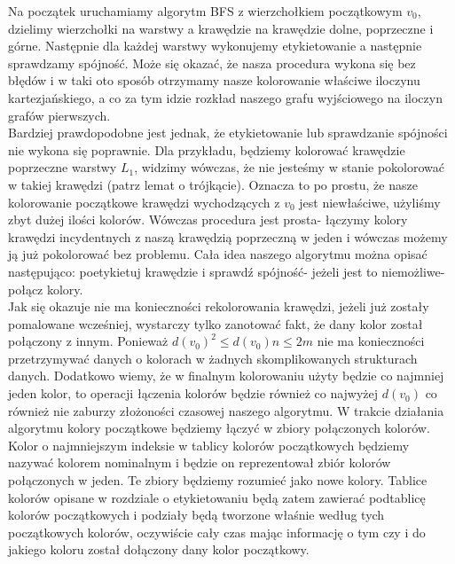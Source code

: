 \documentclass[12pt,a4paper,titlepage]{article}
\newcommand\tab[1][1cm]{\hspace*{#1}}
\begin{document}
\tab[0.6cm]Na początek uruchamiamy algorytm BFS z wierzchołkiem początkowym $v_0$, dzielimy wierzchołki na warstwy a krawędzie na krawędzie dolne, poprzeczne i górne. Następnie dla każdej warstwy wykonujemy etykietowanie a następnie sprawdzamy spójność. Może się okazać, że nasza procedura wykona się bez błędów i w taki oto sposób otrzymamy nasze kolorowanie właściwe iloczynu kartezjańskiego, a co za tym idzie rozkład naszego grafu wyjściowego na iloczyn grafów pierwszych.\\
\tab[0.6cm]Bardziej prawdopodobne jest jednak, że etykietowanie lub sprawdzanie spójności nie wykona się poprawnie. Dla przykładu, będziemy kolorować krawędzie poprzeczne warstwy $L_1$, widzimy wówczas, że nie jesteśmy w stanie pokolorować w takiej krawędzi (patrz lemat o trójkącie). Oznacza to po prostu, że nasze kolorowanie początkowe krawędzi wychodzących z $v_0$ jest niewłaściwe, użyliśmy zbyt dużej ilości kolorów. Wówczas procedura jest prosta- łączymy kolory krawędzi incydentnych z naszą krawędzią poprzeczną w jeden i wówczas możemy ją już pokolorować bez problemu. Cała idea naszego algorytmu można opisać następująco: poetykietuj krawędzie i sprawdź spójność- jeżeli jest to niemożliwe- połącz kolory. \\
\tab[0.6cm]Jak się okazuje nie ma konieczności rekolorowania krawędzi, jeżeli już zostały pomalowane wcześniej, wystarczy tylko zanotować fakt, że dany kolor został połączony z innym. Ponieważ $d(v_0)^2 \leqslant d(v_0)n \leqslant 2m $ nie ma konieczności przetrzymywać danych o kolorach w żadnych skomplikowanych strukturach danych. Dodatkowo wiemy, że w finalnym kolorowaniu użyty będzie co najmniej jeden kolor, to operacji łączenia kolorów będzie również co najwyżej $d(v_0)$ co również nie zaburzy złożoności czasowej naszego algorytmu. W trakcie działania algorytmu kolory początkowe będziemy łączyć w zbiory połączonych kolorów. Kolor o najmniejszym indeksie w tablicy kolorów początkowych będziemy nazywać kolorem nominalnym i będzie on reprezentował zbiór kolorów połączonych w jeden. Te zbiory będziemy rozumieć jako nowe kolory. Tablice kolorów opisane w rozdziale o etykietowaniu będą zatem zawierać podtablicę kolorów początkowych i podziały będą tworzone właśnie według tych początkowych kolorów, oczywiście cały czas mając informację o tym czy i do jakiego koloru został dołączony dany kolor początkowy.\\
\end{document}

